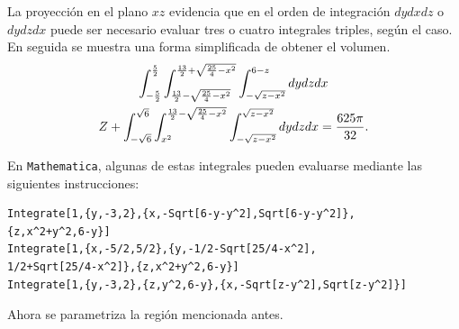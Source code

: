 La proyección en  el plano $xz$ evidencia que en el orden de integración $dydxdz$ o $dydzdx$ puede ser necesario evaluar tres o cuatro integrales triples, según el caso.
En seguida se muestra una forma simplificada de obtener el volumen.
\begin{multline*}
\int_{-\frac{5}{2}}^{\frac{5}{2}}\int_{\frac{13}{2}-\sqrt{\frac{25}{4}-x^2}}^{\frac{13}{2}+\sqrt{\frac{25}{4}-x^2}}\int_{-\sqrt{z-x^2}}^{6-z}dydzdx \\Z +\int_{-\sqrt{6}}^{\sqrt{6}}\int_{x^2}^{\frac{13}{2}-\sqrt{\frac{25}{4}-x^2}}\int_{-\sqrt{z-x^2}}^{\sqrt{z-x^2}}dydzdx = \frac{625\pi}{32}.
\end{multline*}

En \verb"Mathematica", algunas de estas integrales pueden evaluarse mediante las siguientes instrucciones:

\begin{tcolorbox}[title=\bf Instrucción en \verb"Mathematica"]\begin{Verbatim}[formatcom=\letraverbatim]
Integrate[1,{y,-3,2},{x,-Sqrt[6-y-y^2],Sqrt[6-y-y^2]},
{z,x^2+y^2,6-y}]
Integrate[1,{x,-5/2,5/2},{y,-1/2-Sqrt[25/4-x^2],
1/2+Sqrt[25/4-x^2]},{z,x^2+y^2,6-y}]
Integrate[1,{y,-3,2},{z,y^2,6-y},{x,-Sqrt[z-y^2],Sqrt[z-y^2]}]
\end{Verbatim}
\end{tcolorbox}

Ahora se parametriza la región mencionada antes.

